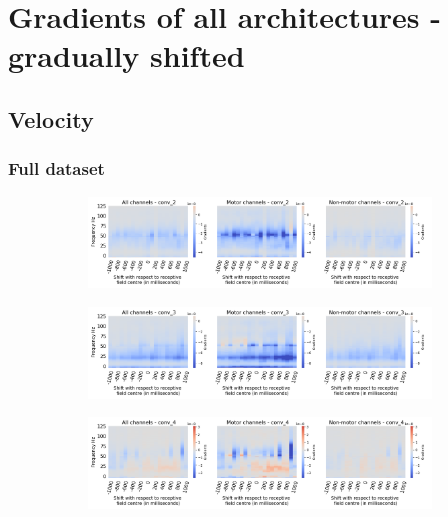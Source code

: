\chapter{Gradients of all architectures - gradually shifted}\label{appendixC}

\section*{Velocity}\label{sec:velocity-appendixC}

\subsection*{Full dataset}\label{subsec:vel-full-dataset-appendixC}
\begin{figure}[!htpb]
\centering
\begin{subfigure}[b]{\textwidth}
   \includegraphics[width=1\linewidth]{img/appendix/C/m/vel/sbp0_m_shift_gradients_conv_2_all_kinds}
   \caption{}
   \label{fig:vel-shifting-grads-conv-2}
\end{subfigure}

\begin{subfigure}[b]{\textwidth}
   \includegraphics[width=1\linewidth]{img/appendix/C/m/vel/sbp0_m_shift_gradients_conv_3_all_kinds}
   \caption{}
   \label{fig:vel-shifting-grads-conv-3}
\end{subfigure}

\begin{subfigure}[b]{\textwidth}
   \includegraphics[width=1\linewidth]{img/appendix/C/m/vel/sbp0_m_shift_gradients_conv_4_all_kinds}
   \caption{}
   \label{fig:vel-shifting-grads-conv-4}
\end{subfigure}


\end{figure}
